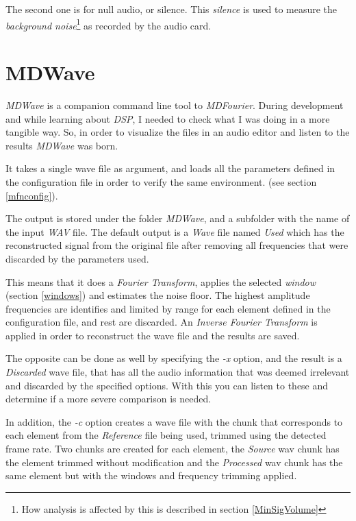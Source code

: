 \documentclass[10pt,a4paper]{report}
\begin{document}
\begin{appendices}
The second one is for null audio, or silence. This \textit{silence} is used to measure the \textit{background noise}\footnote{How analysis is affected by this is described in section \ref{MinSigVolume}} as recorded by the audio card. 	
	
\chapter{MDWave}
\label{mdwave}

\textit{MDWave} is a companion command line tool to \textit{MDFourier}. During development and while learning about \textit{DSP}, I needed to check what I was doing in a more tangible way. So, in order to visualize the files in an audio editor and listen to the results \textit{MDWave} was born.

It takes a single wave file as argument, and loads all the parameters defined in the configuration file in order to verify the same environment. (see section \ref{mfnconfig}).

The output is stored under the folder \textit{MDWave}, and a subfolder with the name of the input \textit{WAV} file. The default output is a \textit{Wave} file named \textit{Used} which has the reconstructed signal from the original file after removing all frequencies that were discarded by the parameters used.

This means that it does a \textit{Fourier Transform}, applies the selected \textit{window} (section \ref{windows}) and estimates the noise floor. The highest amplitude frequencies are identifies and limited by range for each element defined in the configuration file, and rest are discarded. An \textit{Inverse Fourier Transform} is applied in order to reconstruct the wave file and the results are saved.

The opposite can be done as well by specifying the \textit{-x} option, and the result is a \textit{Discarded} wave file, that has all the audio information that was deemed irrelevant and discarded by the specified options. With this you can listen to these and determine if a more severe comparison is needed.

In addition, the \textit{-c} option creates a wave file with the chunk that corresponds to each element from the \textit{Reference} file being used, trimmed using the detected frame rate. Two chunks are created for each element, the \textit{Source} wav chunk has the element trimmed without modification and the \textit{Processed} wav chunk has the same element but with the windows and frequency trimming applied.


\end{appendices}
\end{document}
